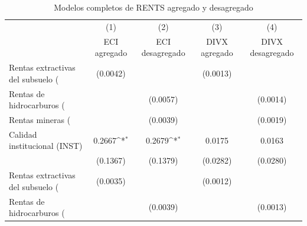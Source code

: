 \begin{table}[htbp]\centering
\def\sym#1{\ifmmode^{#1}\else\(^{#1}\)\fi}
\caption{Modelos completos de RENTS agregado y desagregado}
\begin{tabular}{l*{4}{c}}
\toprule
                    &\multicolumn{1}{c}{(1)}&\multicolumn{1}{c}{(2)}&\multicolumn{1}{c}{(3)}&\multicolumn{1}{c}{(4)}\\
                    &\multicolumn{1}{c}{ECI agregado}&\multicolumn{1}{c}{ECI desagregado}&\multicolumn{1}{c}{DIVX agregado}&\multicolumn{1}{c}{DIVX desagregado}\\
\midrule
Rentas extractivas del subsuelo (%
                    &    (0.0042)         &                     &    (0.0013)         &                     \\
\addlinespace
Rentas de hidrocarburos (%
                    &                     &    (0.0057)         &                     &    (0.0014)         \\
\addlinespace
Rentas mineras (%
                    &                     &    (0.0039)         &                     &    (0.0019)         \\
\addlinespace
Calidad institucional (INST)&      0.2667\sym{*}  &      0.2679\sym{*}  &      0.0175         &      0.0163         \\
                    &    (0.1367)         &    (0.1379)         &    (0.0282)         &    (0.0280)         \\
\addlinespace
Rentas extractivas del subsuelo (%
                    &    (0.0035)         &                     &    (0.0012)         &                     \\
\addlinespace
Rentas de hidrocarburos (%
                    &                     &    (0.0039)         &                     &    (0.0013)         \\

\end{tabular}
\end{table}
